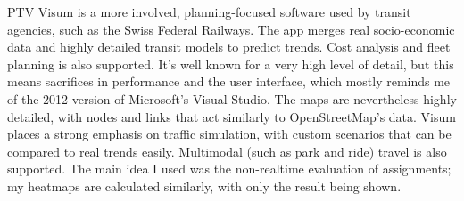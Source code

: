 PTV Visum is a more involved, planning-focused software used by transit agencies, such as the Swiss Federal Railways. The app merges real socio-economic data and highly detailed transit models to predict trends. Cost analysis and fleet planning is also supported. It's well known for a very high level of detail, but this means sacrifices in performance and the user interface, which mostly reminds me of the 2012 version of Microsoft's Visual Studio. The maps are nevertheless highly detailed, with nodes and links that act similarly to OpenStreetMap's data. Visum places a strong emphasis on traffic simulation, with custom scenarios that can be compared to real trends easily. Multimodal (such as park and ride) travel is also supported. The main idea I used was the non-realtime evaluation of assignments; my heatmaps are calculated similarly, with only the result being shown.